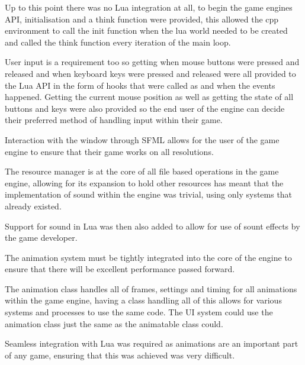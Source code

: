 \documentclass[11pt,a4paper,titlepage]{article}
\begin{document}
    Up to this point there was no Lua integration at all, to begin the game engines API, initialisation and a think function were provided, this allowed the cpp environment to call the init function when the lua world needed to be created and called the think function every iteration of the main loop.

    User input is a requirement too so getting when mouse buttons were pressed and released and when keyboard keys were pressed and released were all provided to the Lua API in the form of hooks that were called as and when the events happened. Getting the current mouse position as well as getting the state of all buttons and keys were also provided so the end user of the engine can decide their preferred method of handling input within their game.


   Interaction with the window through SFML allows for the user of the game engine to ensure that their game works on all resolutions.


    The resource manager is at the core of all file based operations in the game engine, allowing for its expansion to hold other resources has meant that the implementation of sound within the engine was trivial, using only systems that already existed. 
    
    Support for sound in Lua was then also added to allow for use of sount effects by the game developer.


    The animation system must be tightly integrated into the core of the engine to ensure that there will be excellent performance passed forward.

    The animation class handles all of frames, settings and timing for all animations within the game engine, having a class handling all of this allows for various systems and processes to use the same code. The UI system could use the animation class just the same as the animatable class could.

    Seamless integration with Lua was required as animations are an important part of any game, ensuring that this was achieved was very difficult.
\end{document}
